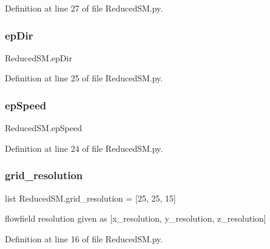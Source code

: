 Definition at line 27 of file Reduced\+S\+M.\+py.

\mbox{\label{namespace_reduced_s_m_a2e00f0fe37b83224dc19800e4eb332a4}} 
\subsubsection{\texorpdfstring{ep\+Dir}{epDir}}
{\footnotesize\ttfamily Reduced\+S\+M.\+ep\+Dir}



Definition at line 25 of file Reduced\+S\+M.\+py.

\mbox{\label{namespace_reduced_s_m_aa4f3b7b9255fe90c846c6e42d57ab5f1}} 
\subsubsection{\texorpdfstring{ep\+Speed}{epSpeed}}
{\footnotesize\ttfamily Reduced\+S\+M.\+ep\+Speed}



Definition at line 24 of file Reduced\+S\+M.\+py.

\mbox{\label{namespace_reduced_s_m_ac73e3bc6b17648d508dd822d76929524}} 
\subsubsection{\texorpdfstring{grid\+\_\+resolution}{grid\_resolution}}
{\footnotesize\ttfamily list Reduced\+S\+M.\+grid\+\_\+resolution = \mbox{[}25, 25, 15\mbox{]}}



flowfield resolution given as \mbox{[}x\+\_\+resolution, y\+\_\+resolution, z\+\_\+resolution\mbox{]} 



Definition at line 16 of file Reduced\+S\+M.\+py.

\mbox{\label{namespace_reduced_s_m_aef5d3f10407f244dce4feddcf7947ed3}} 
